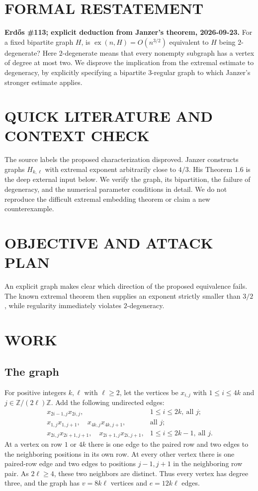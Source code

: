 \section{FORMAL RESTATEMENT}
\textbf{Erd\H{o}s \#113; explicit deduction from Janzer's theorem, 2026-09-23.}
For a fixed bipartite graph $H$, is $\operatorname{ex}(n,H)=O(n^{3/2})$ equivalent to $H$ being $2$-degenerate? Here $2$-degenerate means that every nonempty subgraph has a vertex of degree at most two. We disprove the implication from the extremal estimate to degeneracy, by explicitly specifying a bipartite $3$-regular graph to which Janzer's stronger estimate applies.

\section{QUICK LITERATURE AND CONTEXT CHECK}
The source labels the proposed characterization disproved. Janzer constructs graphs $H_{k,\ell}$ with extremal exponent arbitrarily close to $4/3$. His Theorem 1.6 is the deep external input below. We verify the graph, its bipartition, the failure of degeneracy, and the numerical parameter conditions in detail. We do not reproduce the difficult extremal embedding theorem or claim a new counterexample.

\section{OBJECTIVE AND ATTACK PLAN}
An explicit graph makes clear which direction of the proposed equivalence fails. The known extremal theorem then supplies an exponent strictly smaller than $3/2$, while regularity immediately violates $2$-degeneracy.

\section{WORK}
\subsection{The graph}
For positive integers $k,\ell$ with $\ell\geq2$, let the vertices be $x_{i,j}$ with $1\leq i\leq4k$ and $j\in\mathbb Z/(2\ell)\mathbb Z$. Add the following undirected edges:
\[
\begin{array}{ll}
x_{2i-1,j}x_{2i,j},&1\leq i\leq2k,\ \text{all }j;\\
x_{1,j}x_{1,j+1},\quad x_{4k,j}x_{4k,j+1},&\text{all }j;\\
x_{2i,j}x_{2i+1,j+1},\quad x_{2i+1,j}x_{2i,j+1},
&1\leq i\leq2k-1,\ \text{all }j.
\end{array}
\tag{1}
\]
At a vertex on row $1$ or $4k$ there is one edge to the paired row and two edges to the neighboring positions in its own row. At every other vertex there is one paired-row edge and two edges to positions $j-1,j+1$ in the neighboring row pair. As $2\ell\geq4$, these two neighbors are distinct. Thus every vertex has degree three, and the graph has $v=8k\ell$ vertices and $e=12k\ell$ edges.

